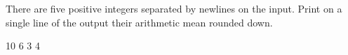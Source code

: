 




There are five positive integers separated by newlines on the input. Print on a single line of the output their arithmetic mean rounded down.

10
6
3
4
\koniec

